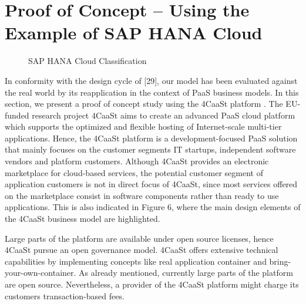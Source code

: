 \chapter{Proof of Concept -- Using the Example of SAP HANA Cloud}\label{ch:poc}

\begin{comment}

	GOV 0.6
	TS 0.5
	AS 0.4
	CVP_ITS 0.04
	CVP_ISV 0.05
	CVP_AC 0.01 oder 0.02
	CVP_SI 0.03
	CVP_PC 0.07
	PoAaC_ITS 0.01
	PoAaC_ISV 0.01
	PoAaC_AC 0.02
	PoAaC_SI 0.025
	PoAaC_PC 0.025
	
	Senior Researcher
		expert in 
			a) PaaS development 
			b) Innovation and network theorie

\end{comment}

\begin{figure}[tb]
	\centering
	
	\caption{SAP HANA Cloud Classification}
	\label{fig:cs_sap}
\end{figure}


In conformity with the design cycle of [29], our model has been evaluated against the real world by its reapplication in the context of PaaS business models. In this section, we present a proof of concept study using the 4CaaSt platform . The EU-funded research project 4CaaSt aims to create an advanced PaaS cloud platform which supports the optimized and flexible hosting of Internet-scale multi-tier applications. Hence, the 4CaaSt platform is a development-focused PaaS solution that mainly focuses on the customer segments IT startups, independent software vendors and platform customers. Although 4CaaSt provides an electronic marketplace for cloud-based services, the potential customer segment of application customers is not in direct focus of 4CaaSt, since most services offered on the marketplace consist in software components rather than ready to use applications. This is also indicated in Figure 6, where the main design elements of the 4CaaSt business model are highlighted.

Large parts of the platform are available under open source licenses, hence 4CaaSt pursue an open governance model. 4CaaSt offers extensive technical capabilities by implementing concepts like real application container and bring-your-own-container. As already mentioned, currently large parts of the platform are open source. Nevertheless, a provider of the 4CaaSt platform might charge its customers transaction-based fees.
 
